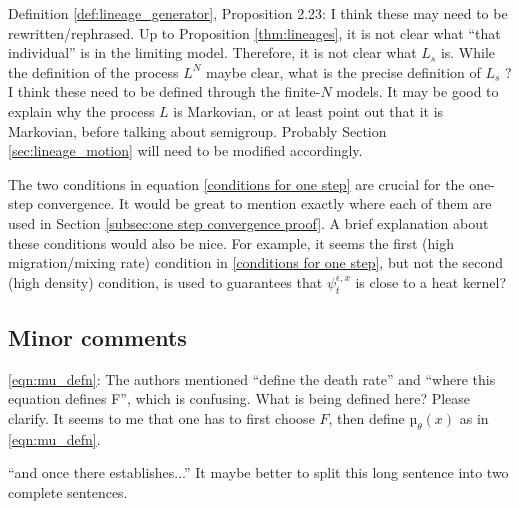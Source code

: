 \reply{
}

\begin{point}{\revref}
Definition \ref{def:lineage_generator}, Proposition 2.23: I think these may need to be rewritten/rephrased. Up
to Proposition \ref{thm:lineages}, it is not clear what ``that individual'' is in the limiting model. Therefore,
it is not clear what $L_s$ is. While the definition of the process $L^N$ maybe clear, what is the
precise definition of $L_s$ ? I think these need to be defined through the finite-$N$ models. It may
be good to explain why the process $L$ is Markovian, or at least point out that it is Markovian,
before talking about semigroup. Probably Section \ref{sec:lineage_motion} will need to be modified accordingly.
\end{point}

\reply{
}

\begin{point}{\revref}
The two conditions in equation \eqref{conditions for one step} are crucial for the one-step convergence.
It would be great to mention exactly where each of them are used in Section \ref{subsec:one step convergence proof}.
A brief explanation about these conditions would also be nice. For example, it seems the first (high
migration/mixing rate) condition in \eqref{conditions for one step},
but not the second (high density) condition, is used
to guarantees that $\psi_t^{\epsilon,x}$ is close to a heat kernel?
\end{point}

\reply{
}

\subsection*{Minor comments}

\begin{point}{\revref}
\eqref{eqn:mu_defn}: The authors mentioned ``define the death rate'' and ``where this equation defines F'',
which is confusing. What is being defined here? Please clarify. It seems to me that one has
to first choose $F$, then define $µ_\theta(x)$ as in \eqref{eqn:mu_defn}.
\end{point}

\reply{
}

\begin{point}{\revref}
``and once there establishes...'' It maybe better to split this
long sentence into two complete sentences.
\end{point}

